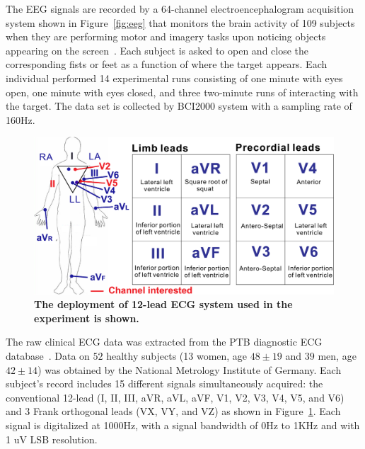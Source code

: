 The EEG signals are recorded by a 64-channel electroencephalogram acquisition system shown in Figure~\ref{fig:eeg} that monitors the brain activity of 109 subjects when they are performing motor and imagery tasks upon noticing objects appearing on the screen~\cite{Physio_EEG}. Each subject is asked to open and close the corresponding fists or feet as a function of where the target appears. Each individual performed 14 experimental runs consisting of one minute with eyes open, one minute with eyes closed, and three two-minute runs of interacting with the target. The data set is collected by BCI2000 system with a sampling rate of 160Hz.
\begin{figure}%
\centering
\includegraphics[width=0.9\columnwidth]{ecg.eps}
\caption{\textbf{The deployment of 12-lead ECG system used in the experiment is shown. }}\label{fig:ecg}
\vskip -6mm
\end{figure} 
The raw clinical ECG data was extracted from the PTB diagnostic ECG database~\cite{bousseljot1995nutzung}. Data on $52$ healthy subjects (13 women, age $48\pm 19$ and $39$ men, age $42\pm 14$) was obtained by the National Metrology Institute of Germany. Each subject’s record includes 15 different signals simultaneously acquired: the conventional 12-lead (I, II, III, aVR, aVL, aVF, V1, V2, V3, V4, V5, and V6) and 3 Frank orthogonal leads (VX, VY, and VZ) as shown in Figure~\ref{fig:ecg}. Each signal is digitalized at 1000Hz, with a signal bandwidth of 0Hz to 1KHz and with 1 uV LSB resolution. 

